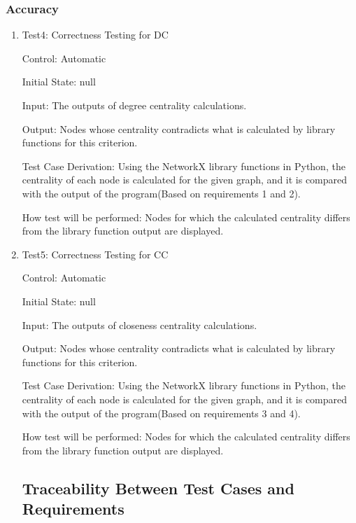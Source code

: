 \documentclass[12pt, titlepage]{article}
\begin{document}
\subsubsection{Accuracy}
\begin{enumerate}
\item{Test4: Correctness Testing for DC\\}

Control: Automatic
					
Initial State: null
					
Input:  The outputs of degree  centrality calculations.
					
Output: Nodes whose centrality contradicts what is calculated by library functions for this criterion.

Test Case Derivation: Using the NetworkX library functions in Python, the centrality of each node is calculated for the given graph, and it is compared with the output of the program(Based on requirements 1 and 2).

How test will be performed: Nodes for which the calculated centrality differs from the library function output are displayed.

\item{Test5: Correctness Testing for CC\\}

Control: Automatic
					
Initial State: null
					
Input: The outputs of closeness centrality calculations.
					
Output: Nodes whose centrality contradicts what is calculated by library functions for this criterion.

Test Case Derivation: Using the NetworkX library functions in Python, the centrality of each node is calculated for the given graph, and it is compared with the output of the program(Based on requirements 3 and 4).

How test will be performed: Nodes for which the calculated centrality differs from the library function output are displayed.

\subsection{Traceability Between Test Cases and Requirements}


\end{enumerate}
\end{document}
